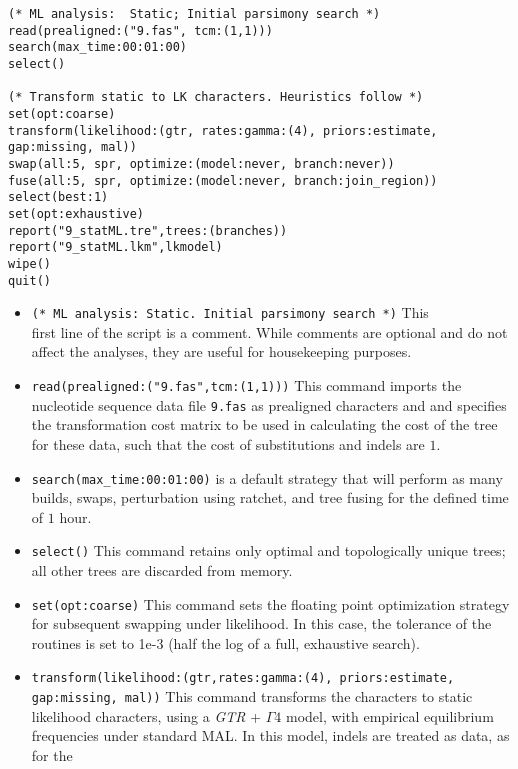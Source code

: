 \begin{verbatim}
(* ML analysis:  Static; Initial parsimony search *)
read(prealigned:("9.fas", tcm:(1,1)))
search(max_time:00:01:00)
select()

(* Transform static to LK characters. Heuristics follow *)
set(opt:coarse)
transform(likelihood:(gtr, rates:gamma:(4), priors:estimate, 
gap:missing, mal))
swap(all:5, spr, optimize:(model:never, branch:never))
fuse(all:5, spr, optimize:(model:never, branch:join_region))
select(best:1)
set(opt:exhaustive)
report("9_statML.tre",trees:(branches))
report("9_statML.lkm",lkmodel)
wipe()
quit()

\end{verbatim}

\begin{itemize}

\item \texttt{(* ML analysis: Static. Initial parsimony search *)} This \\ first line of the 
script is a comment. While comments are optional and do not affect the analyses, they are useful for 
housekeeping purposes.
\item \texttt{read(prealigned:("9.fas",tcm:(1,1)))} This command imports the nucleotide sequence data file \texttt{9.fas} 
as prealigned characters and and specifies the transformation cost matrix to be used in calculating the cost of the tree
for these data, such that the cost of substitutions and indels are $1$.
\item \texttt{search(max\_time:00:01:00)}  is a default strategy that will perform as many builds, 
swaps,  perturbation using ratchet, and tree fusing for the defined time of $ 1 $ hour.
\item \texttt{select()} This command retains only optimal and topologically unique trees; all other trees are discarded 
from memory.  
\item \texttt{set(opt:coarse)} This command sets the floating point optimization strategy for subsequent swapping
under likelihood. In this case, the tolerance of the routines is set to 1e-3 (half the log of a full, exhaustive search).
\item \texttt{transform(likelihood:(gtr,rates:gamma:(4), priors:estimate,\\gap:missing, mal))} This command 
transforms the characters to static likelihood characters, using a \emph{GTR} + $\Gamma 4$ model, with empirical 
equilibrium frequencies under standard MAL. In this model, indels are treated as  data, as for the 

\end{itemize}
